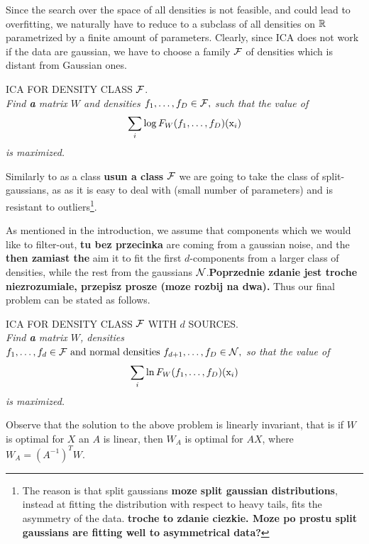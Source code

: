 \medskip

Since the search over the space of all densities is not feasible, and could lead to overfitting, we naturally have to reduce to a subclass of all densities on $\mathbb{R}$ parametrized by a finite amount of parameters. Clearly, since 
ICA does not work if the data are gaussian, we have to choose a family $\mathcal{F}$ of densities which is distant from Gaussian ones. 

\medskip

\noindent ICA FOR DENSITY CLASS $\mathcal{F}$.\\ {\em Find \textbf{a} matrix $W$ and
densities
$
f_1,\ldots,f_D \in \mathcal{F}, 
$
such that the value of 
$$
\sum_i \log F_W(f_1,\ldots,f_D)(\mathrm{x}_i)
$$
is maximized.
}

\medskip

Similarly to \cite{ICA2017pattern} as a class \textbf{usun a class} $\mathcal{F}$ we are going to
take the class of split-gaussians, as 
as it is easy to deal with (small number of parameters) and is resistant to outliers\footnote{The reason is that split gaussians \textbf{moze split gaussian distributions}, instead at fitting the distribution with respect to heavy tails, fits the asymmetry of the data. \textbf{troche to zdanie ciezkie. Moze po prostu split gaussians are fitting well to asymmetrical data?}}.

As mentioned in the introduction, we assume that components which we would like to filter-out, \textbf{tu bez przecinka} are coming from a gaussian noise, and the \textbf{then zamiast the} aim it to fit the first $d$-components from a larger class of densities, while the rest from the gaussians $\mathcal{N}$.\textbf{Poprzednie zdanie jest troche niezrozumiale, przepisz prosze (moze rozbij na dwa).} Thus our final problem can be stated as follows.

\medskip

\noindent ICA FOR DENSITY CLASS $\mathcal{F}$ WITH $d$ SOURCES. \\{\em Find \textbf{a} matrix $W$, densities 
$
f_1,\ldots,f_d \in \mathcal{F} \text{ and normal densities } f_{d+1},\ldots,f_D \in \mathcal{N},
$
so that the value of 
$$
\sum_i \ln F_W(f_1,\ldots,f_D)(\mathrm{x}_i)
$$
is maximized.
}

\medskip

Observe that the solution to the above problem is linearly invariant, that is if
$W$ is optimal for $X$ an $A$ is linear, then $W_A$ is optimal for $AX$,
where $W_A=(A^{-1})^TW$.

